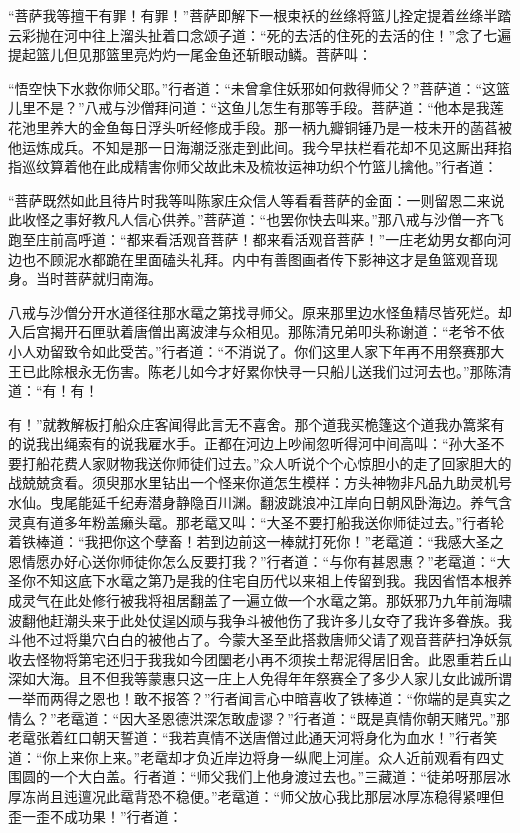 \documentclass[12pt,UTF8]{ctexbook}
\begin{document}
“菩萨我等擅干有罪！有罪！”菩萨即解下一根束袄的丝绦将篮儿拴定提着丝绦半踏云彩抛在河中往上溜头扯着口念颂子道：“死的去活的住死的去活的住！”念了七遍提起篮儿但见那篮里亮灼灼一尾金鱼还斩眼动鳞。菩萨叫：

“悟空快下水救你师父耶。”行者道：“未曾拿住妖邪如何救得师父？”菩萨道：“这篮儿里不是？”八戒与沙僧拜问道：“这鱼儿怎生有那等手段。菩萨道：“他本是我莲花池里养大的金鱼每日浮头听经修成手段。那一柄九瓣铜锤乃是一枝未开的菡萏被他运炼成兵。不知是那一日海潮泛涨走到此间。我今早扶栏看花却不见这厮出拜掐指巡纹算着他在此成精害你师父故此未及梳妆运神功织个竹篮儿擒他。”行者道：

“菩萨既然如此且待片时我等叫陈家庄众信人等看看菩萨的金面：一则留恩二来说此收怪之事好教凡人信心供养。”菩萨道：“也罢你快去叫来。”那八戒与沙僧一齐飞跑至庄前高呼道：“都来看活观音菩萨！都来看活观音菩萨！”一庄老幼男女都向河边也不顾泥水都跪在里面磕头礼拜。内中有善图画者传下影神这才是鱼篮观音现身。当时菩萨就归南海。

八戒与沙僧分开水道径往那水鼋之第找寻师父。原来那里边水怪鱼精尽皆死烂。却入后宫揭开石匣驮着唐僧出离波津与众相见。那陈清兄弟叩头称谢道：“老爷不依小人劝留致令如此受苦。”行者道：“不消说了。你们这里人家下年再不用祭赛那大王已此除根永无伤害。陈老儿如今才好累你快寻一只船儿送我们过河去也。”那陈清道：“有！有！

有！”就教解板打船众庄客闻得此言无不喜舍。那个道我买桅篷这个道我办篙桨有的说我出绳索有的说我雇水手。正都在河边上吵闹忽听得河中间高叫：“孙大圣不要打船花费人家财物我送你师徒们过去。”众人听说个个心惊胆小的走了回家胆大的战兢兢贪看。须臾那水里钻出一个怪来你道怎生模样：方头神物非凡品九助灵机号水仙。曳尾能延千纪寿潜身静隐百川渊。翻波跳浪冲江岸向日朝风卧海边。养气含灵真有道多年粉盖癞头鼋。那老鼋又叫：“大圣不要打船我送你师徒过去。”行者轮着铁棒道：“我把你这个孽畜！若到边前这一棒就打死你！”老鼋道：“我感大圣之恩情愿办好心送你师徒你怎么反要打我？”行者道：“与你有甚恩惠？”老鼋道：“大圣你不知这底下水鼋之第乃是我的住宅自历代以来祖上传留到我。我因省悟本根养成灵气在此处修行被我将祖居翻盖了一遍立做一个水鼋之第。那妖邪乃九年前海啸波翻他赶潮头来于此处仗逞凶顽与我争斗被他伤了我许多儿女夺了我许多眷族。我斗他不过将巢穴白白的被他占了。今蒙大圣至此搭救唐师父请了观音菩萨扫净妖氛收去怪物将第宅还归于我我如今团圞老小再不须挨土帮泥得居旧舍。此恩重若丘山深如大海。且不但我等蒙惠只这一庄上人免得年年祭赛全了多少人家儿女此诚所谓一举而两得之恩也！敢不报答？”行者闻言心中暗喜收了铁棒道：“你端的是真实之情么？”老鼋道：“因大圣恩德洪深怎敢虚谬？”行者道：“既是真情你朝天赌咒。”那老鼋张着红口朝天誓道：“我若真情不送唐僧过此通天河将身化为血水！”行者笑道：“你上来你上来。”老鼋却才负近岸边将身一纵爬上河崖。众人近前观看有四丈围圆的一个大白盖。行者道：“师父我们上他身渡过去也。”三藏道：“徒弟呀那层冰厚冻尚且迍邅况此鼋背恐不稳便。”老鼋道：“师父放心我比那层冰厚冻稳得紧哩但歪一歪不成功果！”行者道：
\end{document}
